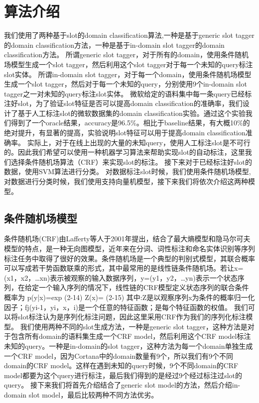 \documentclass[master]{njuthesis}
\begin{document}
\section{算法介绍}
   
    我们使用了两种基于slot的domain classification算法,一种是基于generic slot tagger的domain classification方法，一种是基于in-domain slot tagger的domain classification方法。
    所谓generic slot tagger，对于所有的domain，使用条件随机场模型生成一个slot tagger，然后利用这个slot tagger对于每一个未知的query标注slot实体。
    所谓in-domain slot tagger，对于每一个domain，使用条件随机场模型生成一个slot tagger，然后对于每一个未知的query，分别使用9个in-domain slot tagger之一对未知的query标注slot实体。
    微软给定的语料集中每一条query已经标注好slot，为了验证slot特征是否可以提高domain classification的准确率，我们设计了基于人工标注slot的微软数据集的domain classification实验。通过这个实验我们得到了一个oracle结果，accuracy是96.5\%。相比于baseline结果，有大概10\%的绝对提升，有显著的提高，实验说明slot特征可以用于提高domain classification准确率。
    实际上，对于在线上出现的大量的未知query，使用人工标注slot是不可行的。因此我们希望可以使用一种机器学习算法来帮助实现slot的自动标注，这里我们选择条件随机场算法（CRF）来实现slot的标注。
    接下来对于已经标注好slot的数据，使用SVM算法进行分类。
    对数据标注slot时候，我们使用条件随机场模型,对数据进行分类时候，我们使用支持向量机模型，接下来我们将依次介绍这两种模型。
\subsection{条件随机场模型}

条件随机场(CRF)由Lafferty等人于2001年提出，结合了最大熵模型和隐马尔可夫模型的特点，是一种无向图模型，近年来在分词、词性标注和命名实体识别等序列标注任务中取得了很好的效果。条件随机场是一个典型的判别式模型，其联合概率可以写成若干势函数联乘的形式，其中最常用的是线性链条件随机场。若让x=(x1，x2，…xn)表示被观察的输入数据序列，y=(y1，y2，…yn)表示一个状态序列，在给定一个输入序列的情况下，线性链的CRF模型定义状态序列的联合条件概率为
p(y|x)=exp{} (2-14)
Z(x)={} (2-15)
其中:Z是以观察序列x为条件的概率归一化因子；fj(yi-1，yi，x，i)是一个任意的特征函数；是每个特征函数的权值。
我们可以将slot标注认为是序列化标注问题，因此这里采用CRF作为我们的序列化标注模型。
我们使用两种不同的slot生成方法，一种是generic slot tagger，这种方法是对于包含所有domain的语料集生成一个CRF model，然后利用这个CRF model标注未知的query。一种是in-domain的slot tagger，这种方法为每一个domain单独生成一个CRF model，因为Cortana中的domain数量有9个，所以我们有9个不同domain的CRF model。这样在遇到未知的query时候，9个不同domain的CRF model都要为这个query进行标注，最后我们得到的是经过9个经过标注过slot的query。
接下来我们将首先介绍结合了generic slot model的方法，然后介绍in-domain slot model，最后比较两种不同方法优劣。
\end{document}
